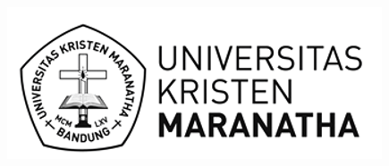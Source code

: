 \documentclass[pdf]{beamer}
\theoremstyle{mystyle}
\begin{document}
\begin{frame}[allowframebreaks]
{\footnotesize
    
    
    }    
\end{frame}





\begin{frame}[plain]
		\centering\includegraphics[scale=0.5]{Logo-Maranatha-Untuk-Belakang-02}	
\end{frame}
\end{document}
